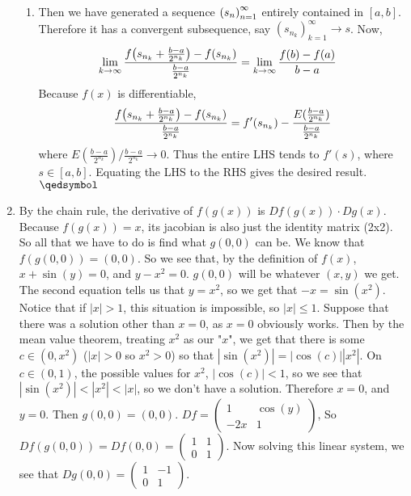 \documentclass[12pt]{article}
\theoremstyle{definition}
\theoremstyle{remark}
\renewcommand{\qed}{\hfill\qedsymbol}
\newcommand{\seq}[2]{\qty(#1_#2)_{#2=1}^{\infty}}
\begin{document}
\begin{enumerate}[leftmargin=\labelsep]
\begin{enumerate}[label=(\alph*)]
			\item 
			Then we have generated a sequence $\seq{s}{n}$ entirely contained in $[a, b]$. Therefore it has a convergent subsequence, say $(s_{n_k})_{k=1}^{\infty} \to s$. Now,
			\begin{align*}
				\lim_{k \to \infty} \frac{f\qty(s_{n_k}+\frac{b-a}{2^{n_k}})-f(s_{n_k})}{\frac{b-a}{2^{n_k}}} &= \lim_{k \to \infty} \frac{f(b)-f(a)}{b-a}
			\end{align*}
			Because $f(x)$ is differentiable, 
			\begin{align*}
				\frac{f\qty(s_{n_k}+\frac{b-a}{2^{n_k}})-f(s_{n_k})}{\frac{b-a}{2^{n_k}}} = f'(s_{n_k}) - \frac{E(\frac{b-a}{2^{n_k}})}{\frac{b-a}{2^{n_k}}}
			\end{align*}
			where $E(\frac{b-a}{2^{n_k}})/\frac{b-a}{2^{n_k}} \to 0$. Thus the entire LHS tends to $f'(s)$, where $s \in [a, b]$. Equating the LHS to the RHS gives the desired result. $\qed$
			
		\end{enumerate}
		\item By the chain rule, the derivative of $f(g(x))$ is $Df(g(x)) \cdot Dg(x)$. Because $f(g(x)) = x$, its jacobian is also just the identity matrix (2x2). So all that we have to do is find what $g(0, 0)$ can be. We know that $f(g(0, 0)) = (0, 0)$. So we see that, by the definition of $f(x)$, $x+\sin(y) = 0$, and $y-x^2 = 0$. $g(0, 0)$ will be whatever $(x, y)$ we get. The second equation tells us that $y = x^2$, so we get that $-x = \sin(x^2)$. Notice that if $|x| > 1$, this situation is impossible, so $|x| \leq 1$. Suppose that there was a solution other than $x = 0$, as $x = 0$ obviously works. Then by the mean value theorem, treating $x^2$ as our "$x$", we get that there is some $c \in (0, x^2)$ ($|x| > 0$ so $x^2 > 0$) so that $|\sin(x^2)| = |\cos(c)||x^2|$. On $c \in (0, 1)$, the possible values for $x^2$, $|\cos(c)| < 1$, so we see that $|\sin(x^2)| < |x^2| < |x|$, so we don't have a solution. Therefore $x = 0$, and $y = 0$. Then $g(0, 0) = (0, 0)$. $Df = 
		\begin{pmatrix}
			1 & \cos(y) \\
			-2x & 1
		\end{pmatrix}$, So $Df(g(0, 0)) = Df(0, 0) = \begin{pmatrix}
		1 & 1 \\
		0 & 1
		\end{pmatrix}$. Now solving this linear system, we see that 	$Dg(0, 0) = \begin{pmatrix}
		1 & -1 \\
		0 & 1
		\end{pmatrix}$.
		

\end{enumerate}
\end{document}
